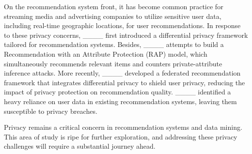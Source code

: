 On the recommendation system front, it has become common practice for streaming media and advertising companies to utilize sensitive user data, including real-time geographic locations, for user recommendations.
In response to these privacy concerns, ____ first introduced a differential privacy framework tailored for recommendation systems. 
Besides, ____ attempts to build a Recommendation with an Attribute Protection (RAP) model, which simultaneously recommends relevant items and counters private-attribute inference attacks.
More recently, ____ developed a federated recommendation framework that integrates differential privacy to shield user privacy, reducing the impact of privacy protection on recommendation quality. 
____ identified a heavy reliance on user data in existing recommendation systems, leaving them susceptible to privacy breaches. 

Privacy remains a critical concern in recommendation systems and data mining. This area of study is ripe for further exploration, and addressing these privacy challenges will require a substantial journey ahead.